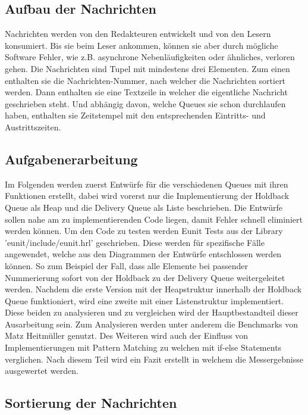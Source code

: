 \subsection{Aufbau der Nachrichten}

Nachrichten werden von den Redakteuren entwickelt und von den Lesern konsumiert. Bis sie beim Leser ankommen, können sie aber durch mögliche Software Fehler, wie z.B. asynchrone Nebenläufigkeiten oder ähnliches, verloren gehen. 
Die Nachrichten sind Tupel mit mindestens drei Elementen. Zum einen enthalten sie die Nachrichten-Nummer, nach welcher die Nachrichten sortiert werden. Dann enthalten sie eine Textzeile in welcher die eigentliche Nachricht geschrieben steht. Und abhängig davon, welche Queues sie schon durchlaufen haben, enthalten sie Zeitstempel mit den entsprechenden Eintritts- und Austrittszeiten. 

\subsection{Aufgabenerarbeitung}

Im Folgenden werden zuerst Entwürfe für die verschiedenen Queues mit ihren Funktionen erstellt, dabei wird vorerst nur die Implementierung der Holdback Queue als Heap und die Delivery Queue als Liste beschrieben. Die Entwürfe sollen nahe am zu implementierenden Code liegen, damit Fehler schnell eliminiert werden können. Um den Code zu testen werden Eunit Tests aus der Library 'eunit/include/eunit.hrl' geschrieben. Diese werden für spezifische Fälle angewendet, welche aus den Diagrammen der Entwürfe entschlossen werden können. So zum Beispiel der Fall, dass alle Elemente bei passender Nummerierung sofort von der Holdback zu der Delivery Queue weitergeleitet werden.
Nachdem die erste Version mit der Heapstruktur innerhalb der Holdback Queue funktioniert, wird eine zweite mit einer Listenstruktur implementiert. Diese beiden zu analysieren und zu vergleichen wird der Hauptbestandteil dieser Ausarbeitung sein. Zum Analysieren werden unter anderem die Benchmarks von Matz Heitmüller genutzt. Des Weiteren wird auch der Einfluss von Implementierungen mit Pattern Matching zu welchen mit if-else Statements verglichen. Nach diesem Teil wird ein Fazit erstellt in welchem die Messergebnisse ausgewertet werden. 

\subsection{Sortierung der Nachrichten} \label{Problemstellungen}

